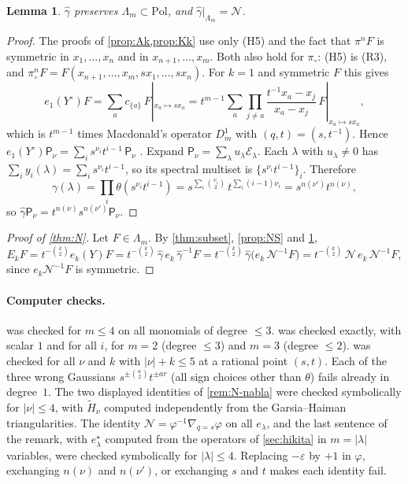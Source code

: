 \documentclass[11pt]{amsart}
\newtheorem{lemma}[theorem]{Lemma}
\theoremstyle{definition}
\theoremstyle{remark}
\numberwithin{equation}{section}
\newcommand{\Lam}{\Lambda}
\begin{document}
\begin{lemma}\label{lem:Nsym}
$\widehat\gamma$ preserves $\Lam_m\subset\mathrm{Pol}$, and $\widehat\gamma|_{\Lam_m}=\mathcal N$.
\end{lemma}
\begin{proof}
The proofs of \cref{prop:Ak,prop:Kk} use only (H5) and the fact that $\pi^nF$ is symmetric in $x_1,\dots,x_n$ and in $x_{n+1},\dots,x_m$. Both also hold for $\pi_\circ$: (H5) is (R3), and $\pi_\circ^nF=F(x_{n+1},\dots,x_m,sx_1,\dots,sx_n)$. For $k=1$ and symmetric $F$ this gives
\[ \textstyle e_1(Y^\circ)F=\sum_ac_{\{a\}}\,F|_{x_a\mapsto sx_a}=t^{m-1}\sum_a\prod_{j\ne a}\frac{t^{-1}x_a-x_j}{x_a-x_j}\,F|_{x_a\mapsto sx_a}, \]
which is $t^{m-1}$ times Macdonald's operator $D^1_m$ \cite[VI (3.4)]{Macdonald95} with $(q,t)=(s,t^{-1})$. Hence $e_1(Y^\circ)\mathsf P_\nu=\sum_is^{\nu_i}t^{i-1}\,\mathsf P_\nu$ \cite[VI \S\S3--4]{Macdonald95}. Expand $\mathsf P_\nu=\sum_\lambda u_\lambda\mathcal E_\lambda$. Each $\lambda$ with $u_\lambda\ne0$ has $\sum_iy_i(\lambda)=\sum_is^{\nu_i}t^{i-1}$, so its spectral multiset is $\{s^{\nu_i}t^{i-1}\}_i$. Therefore
\[ \textstyle\gamma(\lambda)=\prod_i\theta(s^{\nu_i}t^{i-1})=s^{\sum_i\binom{\nu_i}2}\,t^{\sum_i(i-1)\nu_i}=s^{n(\nu')}t^{n(\nu)}, \]
so $\widehat\gamma\mathsf P_\nu=t^{n(\nu)}s^{n(\nu')}\mathsf P_\nu$.
\end{proof}

\begin{proof}[Proof of \cref{thm:N}]
Let $F\in\Lam_m$. By \cref{thm:subset}, \cref{prop:NS} and \cref{lem:Nsym},
\[ E_kF=t^{-\binom k2}e_k(Y)F=t^{-\binom k2}\,\widehat\gamma\,e_k\,\widehat\gamma^{-1}F=t^{-\binom k2}\,\widehat\gamma\bigl(e_k\,\mathcal N^{-1}F\bigr)=t^{-\binom k2}\,\mathcal N\,e_k\,\mathcal N^{-1}F, \]
since $e_k\mathcal N^{-1}F$ is symmetric.
\end{proof}

\paragraph{Computer checks.}  was checked for $m\le4$ on all monomials of degree $\le3$.  was checked exactly, with scalar $1$ and for all $i$, for $m=2$ (degree $\le3$) and $m=3$ (degree $\le2$).  was checked for all $\nu$ and $k$ with $|\nu|+k\le5$ at a rational point $(s,t)$. Each of the three wrong Gaussians $s^{\pm\binom a2}t^{\pm ar}$ (all sign choices other than $\theta$) fails already in degree~$1$. The two displayed identities of \cref{rem:N-nabla} were checked symbolically for $|\nu|\le4$, with $\widetilde H_\nu$ computed independently from the Garsia--Haiman triangularities. The identity $\mathcal N=\varphi^{-1}\nabla_{q=s}\varphi$ on all $e_\lambda$, and the last sentence of the remark, with $e^\star_\lambda$ computed from the operators of \cref{sec:hikita} in $m=|\lambda|$ variables, were checked symbolically for $|\lambda|\le4$. Replacing $-\varepsilon$ by $+1$ in $\varphi$, exchanging $n(\nu)$ and $n(\nu')$, or exchanging $s$ and $t$ makes each identity fail.
\end{document}
